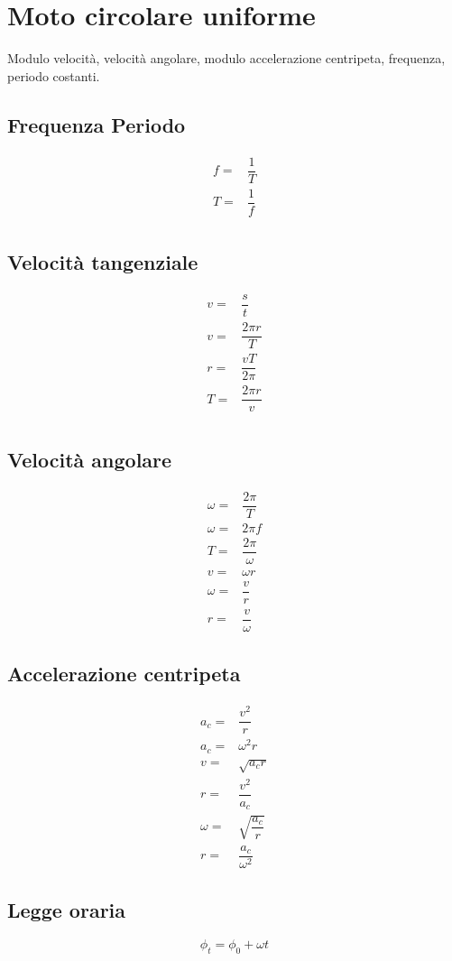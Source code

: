 \chapter{Moto circolare uniforme}
\begin{center}
	
\end{center}
Modulo velocità, velocità angolare, modulo accelerazione centripeta, frequenza, periodo costanti. 
\section{Frequenza Periodo}
\begin{align*}
f=&\dfrac{1}{T}\\
T=&\dfrac{1}{f}\\
\end{align*}
\section{Velocità tangenziale}
\begin{align*}
v=&\dfrac{s}{t}\\
v=&\dfrac{2\pi r}{T}\\
r=&\dfrac{vT}{2\pi}\\
T=&\dfrac{2\pi r}{v}\\
\end{align*}
\section{Velocità angolare}
\begin{align*}
\omega=&\dfrac{2\pi}{T}\\
\omega=&2\pi f\\
T=&\dfrac{2\pi}{\omega}\\
v=&\omega r\\
\omega=&\dfrac{v}{r}\\
r=&\dfrac{v}{\omega}
\end{align*}
\section{Accelerazione centripeta}
\begin{align*}
a_c=&\dfrac{v^2}{r}\\
a_c=&\omega^2 r\\
v=&\sqrt{a_c r}\\
r=&\dfrac{v^2}{a_c}\\
\omega=&\sqrt{\dfrac{a_c}{r}}\\
r=&\dfrac{a_c}{\omega^2}
\end{align*}
\section{Legge oraria}
\begin{equation*}
\phi_t=\phi_0+\omega t
\end{equation*}